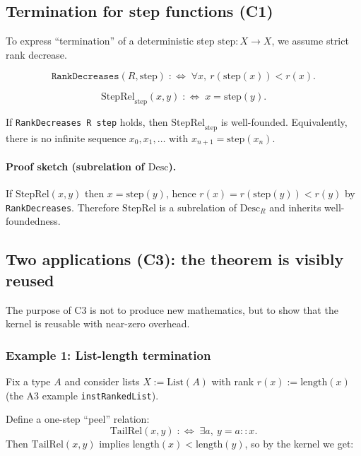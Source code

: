 \subsection{Termination for step functions (C1)}
To express ``termination'' of a deterministic step $\mathrm{step}:X\to X$, we assume strict rank decrease.

\begin{definition}
\label{def:t5-rankdecreases}
\[
  \texttt{RankDecreases}(R,\mathrm{step}) \;:\!\!\iff\; \forall x,\ r(\mathrm{step}(x)) < r(x).
\]
\end{definition}

\begin{definition}
\[
  \mathrm{StepRel}_{\mathrm{step}}(x,y) \;:\!\!\iff\; x = \mathrm{step}(y).
\]
\end{definition}

\begin{theorem}
If \texttt{RankDecreases R step} holds, then $\mathrm{StepRel}_{\mathrm{step}}$ is well-founded.
Equivalently, there is no infinite sequence $x_0,x_1,\dots$ with $x_{n+1}=\mathrm{step}(x_n)$.
\end{theorem}

\paragraph{Proof sketch (subrelation of $\mathrm{Desc}$).}
If $\mathrm{StepRel}(x,y)$ then $x=\mathrm{step}(y)$, hence $r(x)=r(\mathrm{step}(y))<r(y)$ by
\texttt{RankDecreases}. Therefore $\mathrm{StepRel}$ is a subrelation of $\mathrm{Desc}_R$ and inherits
well-foundedness.

\subsection{Two applications (C3): the theorem is visibly reused}
The purpose of C3 is not to produce new mathematics, but to show that the kernel is reusable with
near-zero overhead.

\subsubsection{Example 1: List-length termination}
Fix a type $A$ and consider lists $X:=\mathrm{List}(A)$ with rank $r(x):=\mathrm{length}(x)$
(the A3 example \texttt{instRankedList}).

Define a one-step ``peel'' relation:
\[
  \mathrm{TailRel}(x,y) \;:\!\!\iff\; \exists a,\ y = a :: x.
\]
Then $\mathrm{TailRel}(x,y)$ implies $\mathrm{length}(x) < \mathrm{length}(y)$, so by the kernel we get:

